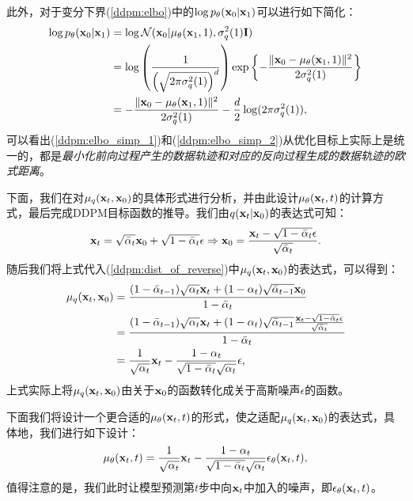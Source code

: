 \documentclass[11pt,a4paper,UTF8]{ctexart}
\begin{document}
此外，对于变分下界(\ref{ddpm:elbo})中的$\log p_{\theta}(\mathbf{x}_0|\mathbf{x}_1)$可以进行如下简化：
\begin{align}
\begin{split}
\log p_{\theta}(\mathbf{x}_0|\mathbf{x}_1) &= \log \mathcal{N}(\mathbf{x}_0| \mu_{\theta}(\mathbf{x}_1,1),\sigma_q^2(1)\mathbf{I}) \\
&= \log \left( \frac{1}{\left(\sqrt{2\pi\sigma_q^2(1)} \right)^d} \right)\exp \left\{-\frac{\|\mathbf{x}_0 -\mu_{\theta}(\mathbf{x}_1,1) \|^2}{2\sigma_q^2(1)} \right\} \\
&= -\frac{\|\mathbf{x}_0 -\mu_{\theta}(\mathbf{x}_1,1) \|^2}{2\sigma_q^2(1)} -\frac{d}{2}\log (2\pi\sigma_q^2(1)),
\label{ddpm:elbo_simp_2}
\end{split}
\end{align}
可以看出(\ref{ddpm:elbo_simp_1})和(\ref{ddpm:elbo_simp_2})从优化目标上实际上是统一的，都是\emph{最小化前向过程产生的数据轨迹和对应的反向过程生成的数据轨迹的欧式距离}。

下面，我们在对$\mu_q(\mathbf{x}_t,\mathbf{x}_0)$的具体形式进行分析，并由此设计$\mu_{\theta}(\mathbf{x}_t,t)$的计算方式，最后完成DDPM目标函数的推导。我们由$q(\mathbf{x}_t|\mathbf{x}_0)$的表达式可知：
\begin{equation*}
    \mathbf{x}_t =\sqrt{\bar{\alpha}_t}\mathbf{x}_0 + \sqrt{1-\bar{\alpha}_t}\epsilon \Rightarrow  \mathbf{x}_0 =\frac{\mathbf{x}_t - \sqrt{1-\bar{\alpha}_t}\epsilon}{\sqrt{\bar{\alpha}_t}}.
\end{equation*}
随后我们将上式代入(\ref{ddpm:dist_of_reverse})中$\mu_q(\mathbf{x}_t,\mathbf{x}_0)$的表达式，可以得到：
\begin{align}
\begin{split}
    \mu_q(\mathbf{x}_t,\mathbf{x}_0) &= \frac{(1-\bar{\alpha}_{t-1})\sqrt{\alpha_t}\mathbf{x}_t +(1-\alpha_t)\sqrt{\bar{\alpha}_{t-1}}\mathbf{x}_0 }{1-\bar{\alpha}_t} \\
    &= \frac{(1-\bar{\alpha}_{t-1})\sqrt{\alpha_t}\mathbf{x}_t +(1-\alpha_t)\sqrt{\bar{\alpha}_{t-1}}\frac{\mathbf{x}_t - \sqrt{1-\bar{\alpha}_t}\epsilon}{\sqrt{\bar{\alpha}_t}} }{1-\bar{\alpha}_t}\\
    &= \frac{1}{\sqrt{\alpha_t}}\mathbf{x}_t - \frac{1-\alpha_t}{\sqrt{1-\bar{\alpha}_t}\sqrt{\alpha_t}}\epsilon,
\end{split}
\label{ddpm:mu_q}
\end{align}
上式实际上将$\mu_q(\mathbf{x}_t,\mathbf{x}_0)$由关于$\mathbf{x}_0$的函数转化成关于高斯噪声$\epsilon$的函数。

下面我们将设计一个更合适的$\mu_{\theta}(\mathbf{x}_t,t)$的形式，使之适配$\mu_q(\mathbf{x}_t,\mathbf{x}_0)$的表达式，具体地，我们进行如下设计：
\begin{equation}
\mu_{\theta}(\mathbf{x}_t,t)=\frac{1}{\sqrt{\alpha_t}}\mathbf{x}_t - \frac{1-\alpha_t}{\sqrt{1-\bar{\alpha}_t}\sqrt{\alpha_t}}\epsilon_{\theta}(\mathbf{x}_t,t),
\label{ddpm:mu_theta}
\end{equation}
值得注意的是，我们此时让模型预测第$t$步中向$\mathbf{x}_t$中加入的噪声，即$\epsilon_{\theta}(\mathbf{x}_t,t)$。
\end{document}
